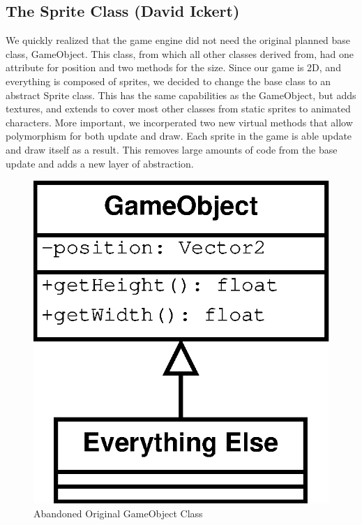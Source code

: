\documentclass[]{article}
\begin{document}
		\subsection{The Sprite Class (David Ickert)}
			We quickly realized that the game engine did not need the original planned base class, GameObject.  This class, from which all other classes derived from, had one attribute for position and two methods for the size.  Since our game is 2D, and everything is composed of sprites, we decided to change the base class to an abstract Sprite class.  This has the same capabilities as the GameObject, but adds textures, and extends to cover most other classes from static sprites to animated characters.  More important, we incorperated two new virtual methods that allow polymorphism for both update and draw.  Each sprite in the game is able update and draw itself as a result.  This removes large amounts of code from the base update and adds a new layer of abstraction.
			\begin{figure}[H]
				\centering
				\includegraphics[scale=0.50]{UML/GameObject}
				\caption{Abandoned Original GameObject Class}				
			\end{figure}
\end{document}
